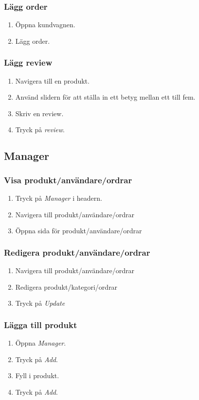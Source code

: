 \documentclass[a4paper]{article}
\begin{document}
\subsubsection{Lägg order}
\begin{enumerate}
  \item Öppna kundvagnen.
  \item Lägg order.
\end{enumerate}
%
\subsubsection{Lägg review}
\begin{enumerate}
  \item Navigera till en produkt.
  \item Använd slidern för att ställa in ett betyg mellan ett till fem.
  \item Skriv en review.
  \item Tryck på \textit{review}.
\end{enumerate}
%
\subsection{Manager}
\subsubsection{Visa produkt/användare/ordrar}
\begin{enumerate}
  \item Tryck på \textit{Manager} i headern.
  \item Navigera till produkt/användare/ordrar
  \item Öppna sida för produkt/användare/ordrar
\end{enumerate}
%
\subsubsection{Redigera produkt/användare/ordrar}
\begin{enumerate}
  \item Navigera till produkt/användare/ordrar
  \item Redigera produkt/kategori/ordrar
  \item Tryck på \textit{Update}
\end{enumerate}
%
\subsubsection{Lägga till produkt}
\begin{enumerate}
  \item Öppna \textit{Manager}.
  \item Tryck på \textit{Add}.
  \item Fyll i produkt.
  \item Tryck på \textit{Add}.
\end{enumerate}
%
\end{document}
